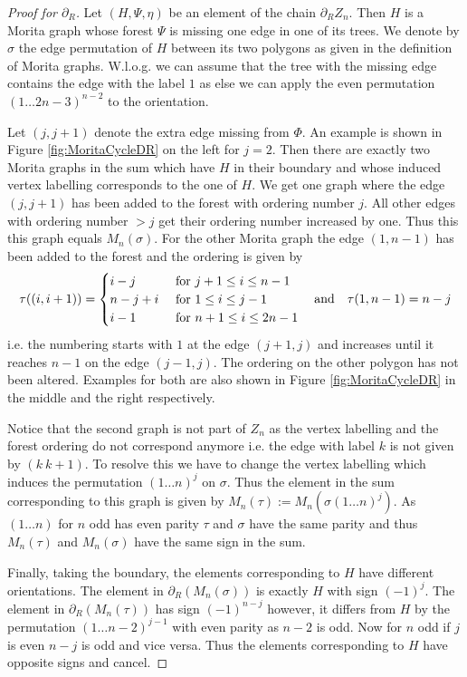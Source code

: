 \begin{proof}[Proof for $\partial_{R}$]
	Let $(H,\Psi,\eta)$ be an element of the chain $\partial_{R} Z_{n}$.
	Then $H$ is a Morita graph whose forest $\Psi$ is missing one edge in one of its trees.
	We denote by $\sigma$ the edge permutation of $H$ between its two polygons as given in the definition of Morita graphs.
	W.l.o.g. we can assume that the tree with the missing edge contains the 
	edge with the label $1$ as else we can apply the even permutation $(1 \ldots 2n-3)^{n-2}$ to the orientation.
	
	Let $(j,j+1)$ denote the extra edge missing from  $\Phi$. An example is shown in Figure \ref{fig:MoritaCycleDR} on the left for $j = 2$.
	Then there are exactly two Morita graphs in the sum which have $H$ in their boundary and whose induced vertex labelling corresponds to the one of $H$.
	We get one graph where the edge $(j,j+1)$ has been added to the forest with ordering number $j$. 
	All other edges with ordering number $> j$ get their ordering number increased by one. Thus this this graph equals $M_{n}(\sigma)$.
	For the other Morita graph the edge $(1,n-1)$ has been added to the forest and the ordering is given by
	\[
		\tau((i,i+1)) = \begin{cases}
			i-j & \text{ for } j+1 \leq i \leq n-1\\
			n-j+i & \text{ for } 1 \leq i \leq j-1\\
			i-1 & \text{ for } n+1 \leq i \leq 2n-1
		\end{cases} \qq{and} \tau(1,n-1) = n-j
	\] 
	i.e. the numbering starts with $1$ at the edge $(j+1,j)$ and increases until it reaches $n-1$ on the edge  $(j-1,j)$. 
	The ordering on the other polygon has not been altered.
	Examples for both are also shown in Figure \ref{fig:MoritaCycleDR} in the middle and the right respectively.
	
	Notice that the second graph is not part of $Z_{n}$ as the vertex labelling and the forest ordering do not correspond anymore
	i.e. the edge with label $k$ is not given by  $(k\ k+1)$.
	To resolve this we have to change the vertex labelling which induces the permutation $(1 \ldots n)^{j}$ on $\sigma$.
	Thus the element in the sum corresponding to this graph is given by  $M_{n}(\tau) := M_{n}(\sigma (1 \ldots n)^{j})$.
	As $(1 \ldots n)$ for $n$ odd has even parity $\tau$ and $\sigma$ have the same parity and thus $M_{n}(\tau)$ and $M_{n}(\sigma)$ have the same sign
	in the sum. 
	
	Finally, taking the boundary, the elements corresponding to $H$ have different orientations.
	The element in $\partial_{R}(M_{n}(\sigma))$ is exactly $H$ with sign $(-1)^{j}$. The element in $\partial_{R}(M_{n}(\tau))$ has sign $(-1)^{n-j}$ however, it 
	differs from $H$ by the permutation $(1 \ldots n-2)^{j - 1}$ with even parity as $n-2$ is odd.
	Now for $n$ odd if $j$ is even $n-j$ is odd and vice versa. Thus the elements corresponding to $H$ have opposite signs and cancel.


\end{proof}
